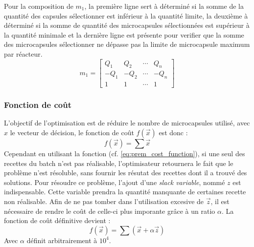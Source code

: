Pour la composition de $m_1$, la première ligne sert à déterminé si la somme de la quantité des capsules sélectionner est inférieur à la quantité limite, la deuxième à déterminé si la somme de  quantité des microcapsules sélectionnées est supérieur à la quantité minimale et la dernière ligne est présente pour verifier que la somme des microcapsules sélectionner ne dépasse pas la limite de microcapsule maximum par réacteur.
\begin{equation}
    m_1 = \left[\begin{array}{cccc}
        Q_1  & Q_2  & \cdots & Q_n\\
        -Q_1 & -Q_2 & \cdots & -Q_n\\
        1    & 1    & \cdots & 1
    \end{array}\right]
\end{equation}
\subsubsection{Fonction de coût}\label{subsubsection:fonction_de_cout}
L'objectif de l'optimisation est de réduire le nombre de microcapsules utilisé, avec $x$ le vecteur de décision, le fonction de coût $f(\overrightarrow{x} )$ est donc : 
\begin{equation}
    f\left(\overrightarrow{x}\right) = \sum \overrightarrow{x} 
    \label{eq:prem_cost_function}
\end{equation}
Cependant en utilisant la fonction (cf. \autoref{eq:prem_cost_function}), si une seul des recettes du batch n'est pas réalisable, l'optimisateur retournera le fait que le problème n'est résoluble, sans fournir les résutat des recettes dont il a trouvé des solutions. Pour résoudre ce problème, l'ajout d'une \textit{slack variable}, nommé $z$ est indispensable. Cette variable prendra la quantité manquante de certaines recette non réalisable. Afin de ne pas tomber dans l'utilisation excesive de $\overrightarrow{z}$, il est nécessaire de rendre le coût de celle-ci plus imporante grâce à un ratio $\alpha$. La fonction de coût définitive devient :
\begin{equation}
    f\left(\overrightarrow{x}\right) = \sum\left(\overrightarrow{x} + \alpha \overrightarrow{z} \right)
    \label{eq:cost_function}
\end{equation}
Avec $\alpha$ définit arbitrairement à $10^{4}$.